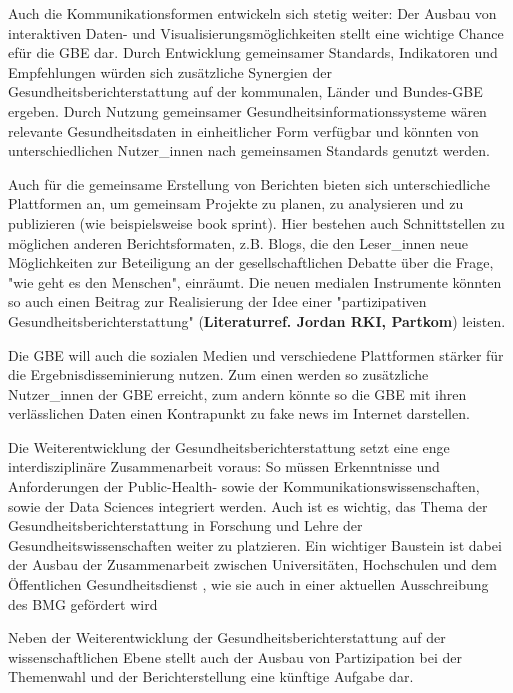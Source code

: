 \documentclass{article}
\begin{document}
Auch die Kommunikationsformen entwickeln sich stetig weiter: Der Ausbau von interaktiven Daten- und Visualisierungsmöglichkeiten stellt eine wichtige Chance efür die GBE dar. Durch Entwicklung gemeinsamer Standards, Indikatoren und Empfehlungen würden sich zusätzliche Synergien der Gesundheitsberichterstattung auf der kommunalen, Länder und Bundes-GBE ergeben. Durch Nutzung gemeinsamer Gesundheitsinformationssysteme wären relevante Gesundheitsdaten in einheitlicher Form verfügbar und könnten von unterschiedlichen Nutzer\_innen nach gemeinsamen Standards genutzt werden. 


Auch für die gemeinsame Erstellung von Berichten bieten sich unterschiedliche Plattformen an, um gemeinsam Projekte zu planen, zu analysieren und zu publizieren (wie beispielsweise book sprint). Hier bestehen auch Schnittstellen zu möglichen anderen Berichtsformaten, z.B. Blogs, die den Leser\_innen neue Möglichkeiten zur Beteiligung an der gesellschaftlichen Debatte über die Frage, "wie geht es den Menschen", einräumt. Die neuen medialen Instrumente könnten so auch einen Beitrag zur Realisierung der Idee einer "partizipativen Gesundheitsberichterstattung" (\textbf{Literaturref. Jordan RKI, Partkom}) leisten.


Die GBE will auch die sozialen Medien und verschiedene Plattformen stärker für die Ergebnisdisseminierung nutzen. Zum einen werden so zusätzliche Nutzer\_innen der GBE erreicht, zum andern könnte so die GBE mit ihren verlässlichen Daten einen Kontrapunkt zu fake news im Internet darstellen. 


Die Weiterentwicklung der  Gesundheitsberichterstattung setzt eine enge interdisziplinäre Zusammenarbeit voraus: So müssen Erkenntnisse und Anforderungen der Public-Health- sowie der Kommunikationswissenschaften,  sowie der Data Sciences integriert werden. Auch ist es wichtig, das Thema der Gesundheitsberichterstattung in Forschung und Lehre der Gesundheitswissenschaften weiter zu platzieren. Ein wichtiger Baustein ist dabei der Ausbau der Zusammenarbeit zwischen Universitäten, Hochschulen und dem Öffentlichen Gesundheitsdienst , wie sie auch in einer aktuellen Ausschreibung des BMG\autocite{BMBF}  gefördert wird 


Neben der Weiterentwicklung der Gesundheitsberichterstattung auf der wissenschaftlichen Ebene stellt auch der Ausbau von Partizipation bei der Themenwahl und der Berichterstellung eine künftige Aufgabe dar.
\end{document}
